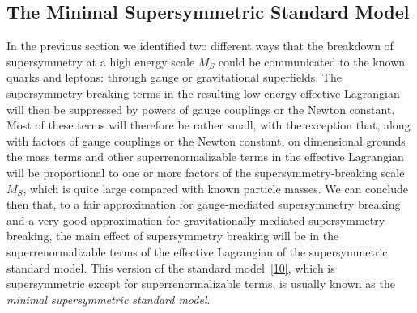 
\subsection{The Minimal Supersymmetric Standard Model}

In the previous section we identified two different ways that the breakdown
of supersymmetry at a high energy scale \(M_S\) could be communicated to
the known quarks and leptons: through gauge or gravitational superfields.
The supersymmetry-breaking terms in the resulting low-energy effective
Lagrangian will then be suppressed by powers of gauge couplings or the
Newton constant. Most of these terms will therefore be rather small, with
the exception that, along with factors of gauge couplings or the Newton
constant, on dimensional grounds the mass terms and other
superrenormalizable terms in the effective Lagrangian will be proportional
to one or more factors of the supersymmetry-breaking scale \(M_S\), which
is quite large compared with known particle masses. We can conclude then
that, to a fair approximation for gauge-mediated supersymmetry breaking
and a very good approximation for gravitationally mediated supersymmetry
breaking, the main effect of supersymmetry breaking will be in the
superrenormalizable terms of the effective Lagrangian of the supersymmetric
standard model. This version of the standard
model~\hyperref[ch28-ref-10]{[10]}, which is supersymmetric except for
superrenormalizable terms, is usually known as the \emph{minimal
supersymmetric standard model}.

